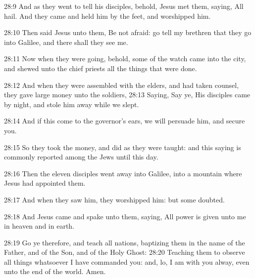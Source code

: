 28:9 And as they went to tell his disciples, behold, Jesus met them,
saying, All hail. And they came and held him by the feet, and
worshipped him.

28:10 Then said Jesus unto them, Be not afraid: go tell my brethren
that they go into Galilee, and there shall they see me.

28:11 Now when they were going, behold, some of the watch came into
the city, and shewed unto the chief priests all the things that were
done.

28:12 And when they were assembled with the elders, and had taken
counsel, they gave large money unto the soldiers, 28:13 Saying, Say
ye, His disciples came by night, and stole him away while we slept.

28:14 And if this come to the governor's ears, we will persuade him,
and secure you.

28:15 So they took the money, and did as they were taught: and this
saying is commonly reported among the Jews until this day.

28:16 Then the eleven disciples went away into Galilee, into a
mountain where Jesus had appointed them.

28:17 And when they saw him, they worshipped him: but some doubted.

28:18 And Jesus came and spake unto them, saying, All power is given
unto me in heaven and in earth.

28:19 Go ye therefore, and teach all nations, baptizing them in the
name of the Father, and of the Son, and of the Holy Ghost: 28:20
Teaching them to observe all things whatsoever I have commanded you:
and, lo, I am with you alway, even unto the end of the world. Amen.

